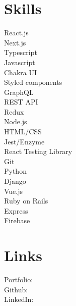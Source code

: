 \documentclass[]{deedy-resume-openfont}
\begin{document}
%
%
%
%

\begin{minipage}[t]{0.25\textwidth} 


\section{Skills}
\textbullet{} React.js \\
\textbullet{} Next.js \\
\textbullet{} Typescript \\
\textbullet{} Javascript \\
\textbullet{} Chakra UI\\
\textbullet{} Styled components \\
\textbullet{} GraphQL\\
\textbullet{} REST API\\
\textbullet{} Redux \\
\textbullet{} Node.js \\
\textbullet{} HTML/CSS \\
\textbullet{} Jest/Enzyme \\
\textbullet{} React Testing Library \\
\textbullet{} Git\\
\textbullet{} Python \\
\textbullet{} Django \\
\textbullet{} Vue.js \\
\textbullet{} Ruby on Rails \\
\textbullet{} Express \\
\textbullet{} Firebase
\sectionsep


\section{Links} 
Portfolio: \href{https://iamgrawal.netlify.app}{} \\
Github: \href{https://github.com/iamgrawal}{} \\
LinkedIn:  \href{https://www.linkedin.com/in/iamgrawal}{} \\


\end{minipage}
\end{document}
